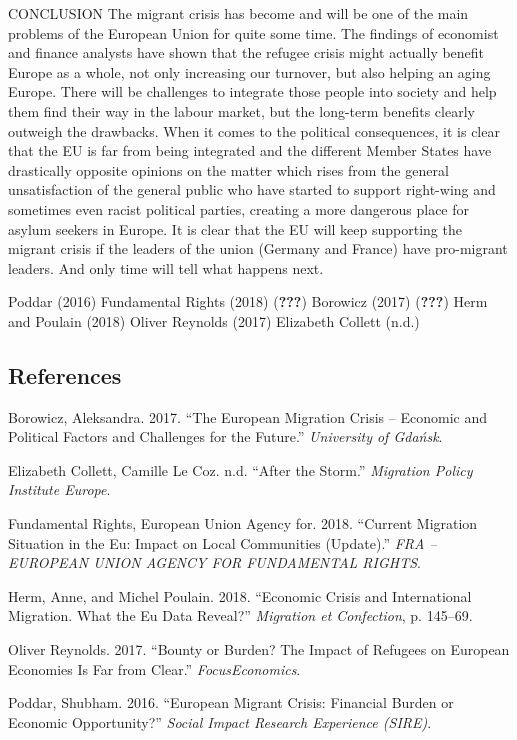 \documentclass[]{article}
\begin{document}
CONCLUSION The migrant crisis has become and will be one of the main
problems of the European Union for quite some time. The findings of
economist and finance analysts have shown that the refugee crisis might
actually benefit Europe as a whole, not only increasing our turnover,
but also helping an aging Europe. There will be challenges to integrate
those people into society and help them find their way in the labour
market, but the long-term benefits clearly outweigh the drawbacks. When
it comes to the political consequences, it is clear that the EU is far
from being integrated and the different Member States have drastically
opposite opinions on the matter which rises from the general
unsatisfaction of the general public who have started to support
right-wing and sometimes even racist political parties, creating a more
dangerous place for asylum seekers in Europe. It is clear that the EU
will keep supporting the migrant crisis if the leaders of the union
(Germany and France) have pro-migrant leaders. And only time will tell
what happens next.

Poddar (2016) Fundamental Rights (2018) ({\textbf{???}}) Borowicz (2017)
({\textbf{???}}) Herm and Poulain (2018) Oliver Reynolds (2017)
Elizabeth Collett (n.d.)

\hypertarget{references}{%
\subsection*{References}\label{references}}

\hypertarget{refs}{}
\leavevmode\hypertarget{ref-aleksandraborowicz2017}{}%
Borowicz, Aleksandra. 2017. ``The European Migration Crisis -- Economic
and Political Factors and Challenges for the Future.'' \emph{University
of Gdańsk}.

\leavevmode\hypertarget{ref-elizabethcollettcamillelecoz}{}%
Elizabeth Collett, Camille Le Coz. n.d. ``After the Storm.''
\emph{Migration Policy Institute Europe}.

\leavevmode\hypertarget{ref-europeanunionagencyforfundamentalrights2018}{}%
Fundamental Rights, European Union Agency for. 2018. ``Current Migration
Situation in the Eu: Impact on Local Communities (Update).'' \emph{FRA
-- EUROPEAN UNION AGENCY FOR FUNDAMENTAL RIGHTS}.

\leavevmode\hypertarget{ref-annehermmichelpoulain2018}{}%
Herm, Anne, and Michel Poulain. 2018. ``Economic Crisis and
International Migration. What the Eu Data Reveal?'' \emph{Migration et
Confection}, p. 145--69.

\leavevmode\hypertarget{ref-oliverreynolds2017}{}%
Oliver Reynolds. 2017. ``Bounty or Burden? The Impact of Refugees on
European Economies Is Far from Clear.'' \emph{FocusEconomics}.

\leavevmode\hypertarget{ref-shubhampoddar2016}{}%
Poddar, Shubham. 2016. ``European Migrant Crisis: Financial Burden or
Economic Opportunity?'' \emph{Social Impact Research Experience (SIRE)}.
\end{document}
